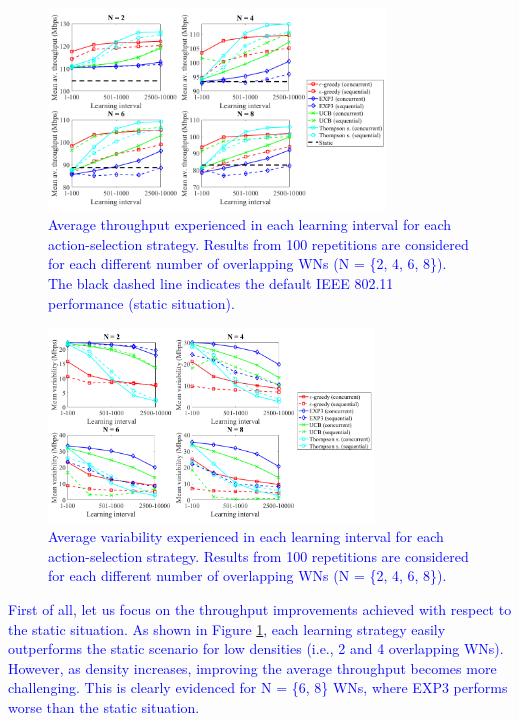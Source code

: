 \documentclass[preprint,12pt]{elsarticle}
\begin{document}
	\begin{figure}[h!]
		\centering
		\includegraphics[width=0.8\textwidth]{images/random_scenarios_results}
		\caption{\textcolor{blue}{Average throughput experienced in each learning interval for each action-selection strategy. Results from 100 repetitions are considered for each different number of overlapping WNs (N = \{2, 4, 6, 8\}). The black dashed line indicates the default IEEE 802.11 performance (static situation).}}
		\label{fig:random_scenarios_results}
	\end{figure}
	
	\begin{figure}[h!]
		\centering
		\includegraphics[width=0.77\textwidth]{images/random_scenarios_results_variability}
		\caption{\textcolor{blue}{Average variability experienced in each learning interval for each action-selection strategy. Results from 100 repetitions are considered for each different number of overlapping WNs (N = \{2, 4, 6, 8\}).}}
		\label{fig:random_scenarios_results_variability}
	\end{figure}
	
	\textcolor{blue}{First of all, let us focus on the throughput improvements achieved with respect to the static situation. As shown in Figure \ref{fig:random_scenarios_results}, each learning strategy easily outperforms the static scenario for low densities (i.e., 2 and 4 overlapping WNs). However, as density increases, improving the average throughput becomes more challenging. This is clearly evidenced for N = \{6, 8\} WNs, where EXP3 performs worse than the static situation.}
	
\end{document}
